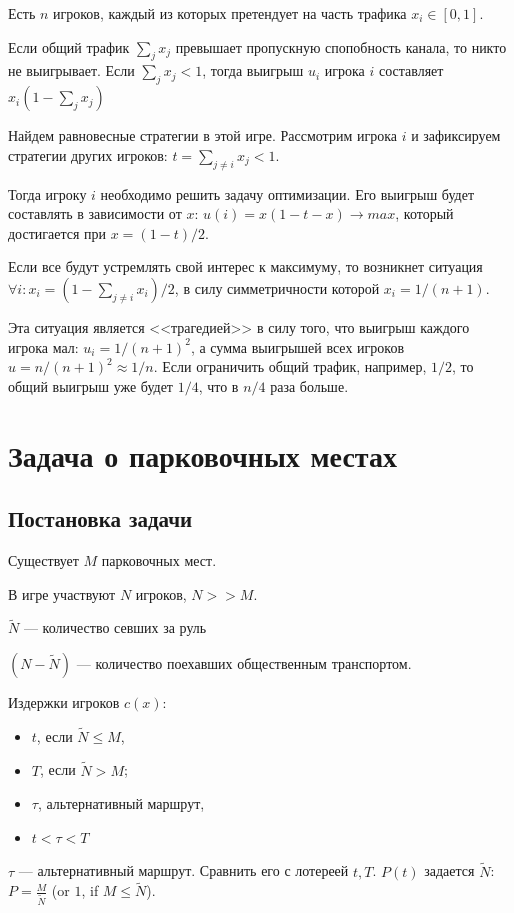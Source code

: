 Есть $n$ игроков, каждый из которых претендует на часть трафика $x_i\in[0,1]$.

Если общий трафик $\sum_j x_j$ превышает пропускную спопобность канала, то никто не выигрывает.
Если
$\sum_j x_j < 1$,
тогда выигрыш $u_i$ игрока 
$i$ составляет $x_i(1-\sum_j x_j)$

Найдем равновесные стратегии в этой игре.
Рассмотрим игрока $i$ и зафиксируем стратегии других игроков: $t=\sum_{j\ne i} x_j<1$.

Тогда игроку $i$ необходимо решить задачу оптимизации. 
Его выигрыш будет составлять в зависимости от $x$:
$u(i)=x(1-t-x)\to max$, который достигается при $x=(1-t)/2$.

Если все будут устремлять свой интерес к максимуму, то возникнет ситуация $\forall i: x_i=(1-\sum_{j\ne i} x_i)/2$, в силу симметричности которой $x_i=1/(n+1)$.

Эта ситуация является <<трагедией>> в силу того, что выигрыш каждого игрока мал: $u_i=1/(n+1)^2$, а сумма выигрышей всех игроков $u=n/(n+1)^2\approx 1/n$. Если ограничить общий трафик, например, $1/2$, то общий выигрыш уже будет $1/4$, что в $n/4$ раза больше\cite[5]{agt2007}.


\chapter{Задача о парковочных местах}

\section{Постановка задачи}

Существует $M$ парковочных мест.

В игре участвуют $N$ игроков, $N >> M$.

$\tilde N$ --- количество севших за руль

$(N - \tilde N)$ --- количество поехавших общественным транспортом.

Издержки игроков $c(x)$:
\begin{itemize}
 \item  $t$, если $\tilde N\le M$,
 \item  $T$, если $\tilde N>M$;
 \item  $\tau$, альтернативный маршрут,
 \item  $t<\tau<T$
\end{itemize}

$\tau$ — альтернативный маршрут.
Сравнить его с лотереей ${t,T}$.
$P(t)$ задается $\tilde N$: $P=\frac{M}{\tilde{N}}$ (or $1$, if $M \le \tilde N$).

